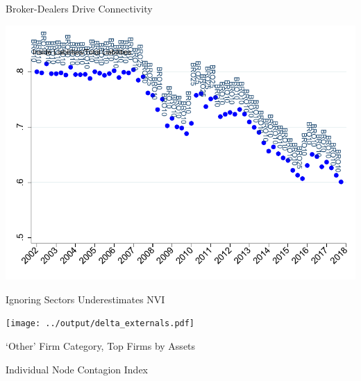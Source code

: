 \documentclass[12pt,envcountsect, leqno,xcolor=dvipsnames]{beamer}
\begin{document}
\begin{frame}{Broker-Dealers Drive Connectivity} 

\begin{center}
\includegraphics[width=\linewidth, height=0.9\textheight,keepaspectratio]{../output/connectivities_1.pdf}
\end{center}

\end{frame}

\begin{frame}{Ignoring Sectors Underestimates NVI} 
\begin{center}
\texttt{[image: ../output/delta\_externals.pdf]} 
\end{center}

\end{frame}

\begin{frame}{`Other' Firm Category, Top Firms by Assets} 
\begin{center}
\begin{table}[htbp] \centering \small

\end{table}
\end{center}

\end{frame}

\begin{frame}{Individual Node Contagion Index} 
\begin{table}[htbp]\centering \scriptsize

\end{table}

\end{frame}
\end{document}
